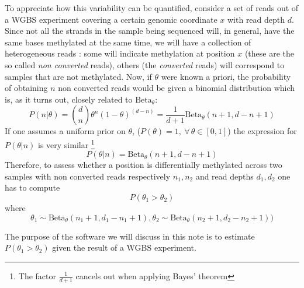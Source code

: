 \documentclass[11pt]{amsart}
\newcommand{\betapdf}{\mbox{Beta}_\theta}
\begin{document}
To appreciate how this variability can be quantified, consider a set of reads out of a WGBS experiment covering a certain genomic coordinate $x$ with read depth $d$. Since not all the strands in the sample being sequenced will, in general,  have the same bases methylated at the same time, we will have a collection of heterogeneous reads : some will indicate methylation at position $x$ (these are the so called {\em non converted} reads), others (the {\em converted} reads) will correspond to samples that are not methylated. 
Now, if $\theta$ were known a priori, the probability of obtaining $n$ non converted reads would be given a binomial distribution which is, as it turns out, closely related to $\betapdf$:
\[P(n|\theta)={d \choose n}\theta^n ({1-\theta})^{(d-n)}=\frac{1}{d+1}\betapdf(n+1,d-n+1)\]
If one assumes a uniform prior on $\theta$, ($P(\theta)=1, \ \forall\, \theta \in [0,1]$) the expression for $P(\theta|n)$ is very similar \footnote{The factor $\frac{1}{d+1}$ cancels out when applying Bayes' theorem}
\[P(\theta|n)=\betapdf(n+1,d-n+1)\]
Therefore, to assess whether a position is differentially methylated across two samples with non converted reads respectively $n_1,n_2$ and read depths $d_1,d_2$ one
has to compute 
\[P(\theta_1>\theta_2) \] where 
\begin{equation}
\label{ineq}
\theta_1 \sim \betapdf(n_1+1,d_1-n_1+1) , \theta_2 \sim \betapdf(n_2+1,d_2-n_2+1))
\end{equation}

The purpose of the software we will discuss in this note is to estimate $P(\theta_1>\theta_2)$ given the result of a WGBS experiment.
\end{document}
